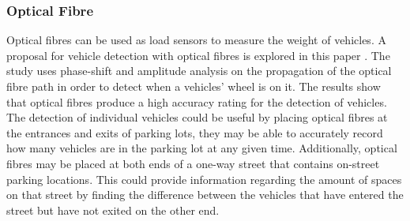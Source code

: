 \subsubsection*{Optical Fibre}
Optical fibres can be used as load sensors to measure the weight of vehicles. A proposal for vehicle detection with optical fibres is explored in this paper \citep{gupta_automated_2016}. The study uses phase-shift and amplitude analysis on the propagation of the optical fibre path in order to detect when a vehicles' wheel is on it. The results show that optical fibres produce a high accuracy rating for the detection of vehicles. The detection of individual vehicles could be useful by placing optical fibres at the entrances and exits of parking lots, they may be able to accurately record how many vehicles are in the parking lot at any given time. Additionally, optical fibres may be placed at both ends of a one-way street that contains on-street parking locations. This could provide information regarding the amount of spaces on that street by finding the difference between the vehicles that have entered the street but have not exited on the other end.